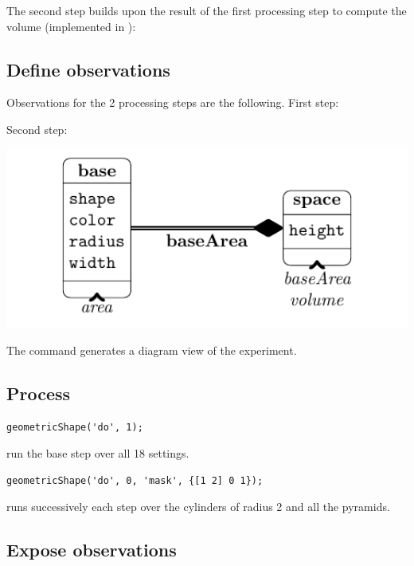 \documentclass[a4paper,fleqn]{tufte-handout}
\begin{document}
The second step builds upon the result of the first processing step to compute the volume (implemented in ):


\subsection{Define observations}

Observations for the 2 processing steps are the following. First step:

Second step:


\begin{marginfigure}
\includegraphics[width=1.2\textwidth]{../demo/geometricShape/report/figures/factors}
\end{marginfigure}

The command  generates a diagram view of the experiment.

\subsection{Process}

\begin{lstlisting}
geometricShape('do', 1);
\end{lstlisting}
run the base step over all 18 settings.
\begin{lstlisting}
geometricShape('do', 0, 'mask', {[1 2] 0 1});
\end{lstlisting}
runs successively each step over the cylinders of radius 2 and all the pyramids.

\subsection{Expose observations}
\end{document}
